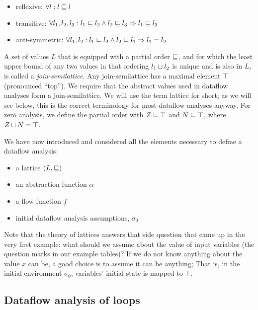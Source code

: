 \documentclass[11pt]{article}
\begin{document}
\begin{itemize}[labelwidth=0.7em, labelsep=0.6em, topsep=0ex, itemsep=0ex,
  parsep=0ex]
\item reflexive: $\forall l : l \sqsubseteq l$
\item transitive: $\forall l_1, l_2, l_3 : l_1 \sqsubseteq l_2 \land l_2 \sqsubseteq l_3 \Rightarrow l_1 \sqsubseteq l_3$
\item anti-symmetric: $\forall l_1, l_2 : l_1 \sqsubseteq l_2 \land l_2 \sqsubseteq l_1 \Rightarrow l_1 = l_2$
\end{itemize}

A set of values $L$ that is equipped with a partial order $\sqsubseteq$, and for which
the least upper bound of any two values in that ordering $l_1 \sqcup l_2$ is
unique and is also in $L$, is called a \textit{join-semilattice}.  Any
join-semilattice has a maximal element $\top$ (pronounced ``top'').  We require
that the abstract values used in dataflow analyses form a join-semilattice.  We
will use the term lattice for short; as we will see below, this is the correct
terminology for most dataflow analyses anyway.
%
For zero analysis, we define the partial order with $Z \sqsubseteq \top$ and $N \sqsubseteq
\top $, where $Z \sqcup N = \top$.


We have now introduced and considered all the elements necessary to define a
dataflow analysis:

\begin{itemize}[labelwidth=0.7em, labelsep=0.6em, topsep=0ex, itemsep=0ex,
  parsep=0ex]
\item a lattice $(L,\sqsubseteq)$
\item an abstraction function $\alpha$
\item a flow function $f$
\item initial dataflow analysis assumptions, $\sigma_0$
\end{itemize}

Note that the theory of lattices answers that side question that came up in the
very first example: what should we assume
about the value of input variables (the question marks in our example tables)? 
If we do not know anything about the value $x$ can be,
a good choice is to assume it can be anything; That is, in the initial
environment $\sigma_0$, variables' initial state is mapped to $\top$.  

\subsection{Dataflow analysis of loops}
\end{document}
